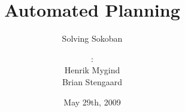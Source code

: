 \documentclass{beamer}%
\author{\textcopyright 2009:\\ Henrik Mygind \\Brian Stengaard}
\title{Automated Planning}
\subtitle{Solving Sokoban}
\institute{Artificial Intelligence, IMM}
\date{May 29th, 2009}
\begin{document}
\AtBeginNote{
\scriptsize
}

\end{document}

